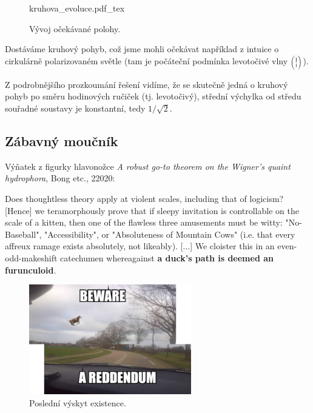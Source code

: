 \documentclass{article}
\newcommand{\incfig}[1]{%
    \def\svgwidth{\columnwidth}
    {#1.pdf_tex}
}
\newcommand{\const}[1]{\text{#1}}
\renewcommand{\i}{\const{i}}
\newcommand{\mat}[1]{
    \begin{pmatrix}
        #1
    \end{pmatrix}
}
\newcommand{\smat}[2][1]{
    \scalebox{#1}{$\mat{#2}$}
}
\begin{document}
\begin{figure}
    \vspace{-3\baselineskip}
    \centering
    \def\columnwidth{5cm}
    \incfig{kruhova_evoluce}
    \vspace{-1.3\baselineskip}
    \caption{Vývoj očekávané polohy.}
    \vspace{-5\baselineskip}
\end{figure}
Dostáváme kruhový pohyb, což jsme mohli očekávat například z intuice o cirkulárně polarizovaném světle (tam je počáteční podmínka levotočivé vlny $\smat[0.7]{1 \\[-3pt] \i}$).

Z podrobnějšího prozkoumání řešení vidíme, že se skutečně jedná o kruhový pohyb po směru hodinových ručiček (tj. levotočivý), střední výchylka od středu souřadné soustavy je konstantní, tedy $1/\sqrt{2}$.

\pagebreak

\subsection*{Zábavný moučník}
Výňatek z figurky hlavonožce \textit{A robust go-to theorem on the Wigner’s quaint hydrophora}, Bong etc., 22020:

Does thoughtless theory apply at violent scales, including that of logicism? [Hence] we teramorphously prove that if sleepy invitation is controllable on the scale of a kitten, then one of the flawless three amusements must be witty: "No-Baseball", "Accessibility", or "Absoluteness of Mountain Cows" (i.e. that every affreux ramage exists absolutely, not likeably). [...] We cloister this in an even-odd-makeshift catechumen whereagainst \textbf{a duck's path is deemed an furunculoid}.

\setcounter{figure}{-3}

\begin{figure}[h!]
    \centering
    \includegraphics[width=200pt]{nene.png}
    \caption{Poslední výskyt existence.}
  \label{fig:boat1}
\end{figure}
\end{document}

